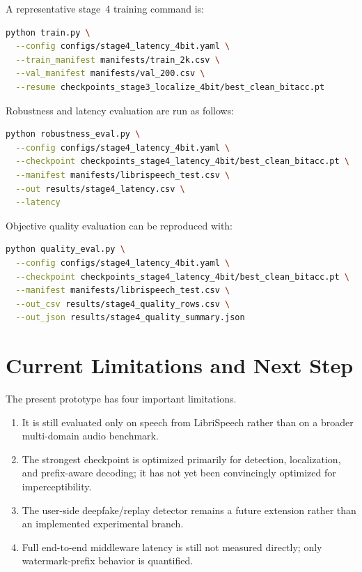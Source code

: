 A representative stage~4 training command is:
\begin{lstlisting}[language=bash,caption={Example stage~4 training command.},label={lst:stage4_cmd}]
python train.py \
  --config configs/stage4_latency_4bit.yaml \
  --train_manifest manifests/train_2k.csv \
  --val_manifest manifests/val_200.csv \
  --resume checkpoints_stage3_localize_4bit/best_clean_bitacc.pt
\end{lstlisting}

Robustness and latency evaluation are run as follows:
\begin{lstlisting}[language=bash,caption={Example robustness and latency evaluation command.},label={lst:robustness_cmd}]
python robustness_eval.py \
  --config configs/stage4_latency_4bit.yaml \
  --checkpoint checkpoints_stage4_latency_4bit/best_clean_bitacc.pt \
  --manifest manifests/librispeech_test.csv \
  --out results/stage4_latency.csv \
  --latency
\end{lstlisting}

Objective quality evaluation can be reproduced with:
\begin{lstlisting}[language=bash,caption={Example objective quality evaluation command.},label={lst:quality_eval_cmd}]
python quality_eval.py \
  --config configs/stage4_latency_4bit.yaml \
  --checkpoint checkpoints_stage4_latency_4bit/best_clean_bitacc.pt \
  --manifest manifests/librispeech_test.csv \
  --out_csv results/stage4_quality_rows.csv \
  --out_json results/stage4_quality_summary.json
\end{lstlisting}

\section{Current Limitations and Next Step}
The present prototype has four important limitations.
\begin{enumerate}[leftmargin=1.25em]
  \item It is still evaluated only on speech from LibriSpeech rather than on a broader multi-domain audio benchmark.
  \item The strongest checkpoint is optimized primarily for detection, localization, and prefix-aware decoding; it has not yet been convincingly optimized for imperceptibility.
  \item The user-side deepfake/replay detector remains a future extension rather than an implemented experimental branch.
  \item Full end-to-end middleware latency is still not measured directly; only watermark-prefix behavior is quantified.
\end{enumerate}

